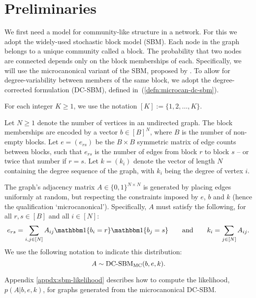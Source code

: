 \section{Preliminaries}

We first need a model for community-like structure in a network. For this we adopt the widely-used stochastic block model (SBM).
Each node in the graph belongs to a unique community called a block. The probability that two nodes are connected depends only on the block memberships of each. Specifically, we will use the microcanonical variant of the SBM, proposed by \citet{Peixoto-Bayesian-Microcanonical}. To allow for degree-variability between members of the same block, we adopt the degree-corrected formulation (DC-SBM), defined in~(\ref{defn:microcan-dc-sbm}).

For each integer $K\geq 1$, we use the notation $[K]:=\{1,2,\ldots,K\}$.

\begin{definition}
	\label{defn:microcan-dc-sbm}
	Let $N \geq 1$ denote the number of vertices in an undirected graph. The block memberships are encoded by a vector $b \in [B]^N$,
where $B$ is the number of non-empty blocks.
	Let $e=(e_{rs})$ be the $B \times B$ symmetric matrix of edge counts 
between blocks, such that $e_{rs}$ is the number of edges from block $r$ to 
block $s$ -- or twice that number if $r=s$. 
	Let $k =(k_i)$ denote the vector of length $N$ containing the degree
sequence of the graph, with $k_i$ being the degree of vertex $i$.

The graph's adjacency matrix $A \in \{0,1\}^{N \times N}$ is generated 
by placing edges uniformly at random, but respecting the constraints 
imposed by $e$, $b$ and $k$ (hence the qualification `microcanonical').
Specifically, $A$ must satisfy the following, for all $r,s\in[B]$
and all $i\in[N]$:
	\begin{equation}
		e_{rs} = \sum_{i, j \in [N]} A_{ij} 
	\one \{b_i = r\} \one \{b_j = s\} 
		\qquad 
		\textrm{and} \qquad
		k_i = \sum_{j \in [N]} A_{ij}.
		\label{eqn:sbm-constraints}
	\end{equation}
We use the following notation to indicate this distribution:
\begin{equation}
		A \sim \mbox{\rm DC-SBM}_{\rm MC} (b, e, k).
	\end{equation}
\end{definition}

Appendix \ref{appdx:sbm-likelihood} describes how to compute the likelihood, $p(A|b,e,k)$, for graphs generated from the microcanonical DC-SBM.
